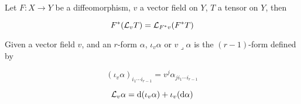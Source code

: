 \begin{lemma}
    Let \(F : X \to Y\) be a diffeomorphism, \(v\) a vector field on \(Y\), \(T\) a tensor on \(Y\), then

    \[F^*(\mathcal{L}_vT) = \mathcal{L}_{F^*v}(F^*T)\]
\end{lemma}

\begin{definition}
    Given a vector field \(v\), and an \(r\)-form \(\alpha\), \(\iota_v\alpha\) or \(v\lrcorner\alpha\) is the \((r-1)\)-form defined by

    \[(\iota_v\alpha)_{i_1\cdots i_{r-1}} = v^j\alpha_{ji_1\cdots i_{r-1}}\]
\end{definition}

\begin{proposition}

    \[\mathcal{L}_v\alpha = \dd(\iota_v\alpha) + \iota_v(\dd\alpha)\]
\end{proposition}
